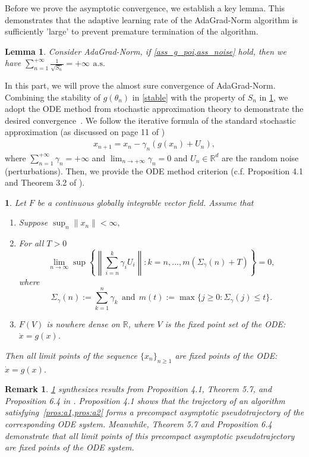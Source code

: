 \documentclass[standalone]{article}
\newcommand{\R}{\mathbb{R}}
\newtheorem{lem}{Lemma}[section]
\newtheorem{rem}{Remark}
\newtheorem{pros}[thm]{\text{Proposition}}
\begin{document}
Before we prove the asymptotic convergence, we establish a key lemma. This demonstrates that the adaptive learning rate of the AdaGrad-Norm algorithm is sufficiently 'large' to prevent premature termination of the algorithm.
\begin{lem}\label{step size}
   Consider AdaGrad-Norm, if \cref{ass_g_poi,ass_noise} hold,  then we have $\sum_{n=1}^{+\infty}\frac{1}{\sqrt{S_{n}}}=+\infty \, \ \text{a.s.}$
\end{lem}


In this part, we will prove the almost sure convergence of AdaGrad-Norm. Combining the stability of $g(\theta_n)$  in \cref{stable} with the property of $S_n$ in \cref{step size}, we adopt the ODE method from stochastic approximation theory to demonstrate the desired convergence~\citep{benaim2006dynamics}. We follow the iterative formula of the standard stochastic approximation (as discussed on page 11 of \cite{benaim2006dynamics})
\begin{align}\label{SA}
x_{n+1} = x_{n} - \gamma_{n}(g(x_{n})+U_{n}),
\end{align}
where $\sum_{n=1}^{+\infty}\gamma_{n}=+\infty$ and $\lim_{n\rightarrow+\infty}\gamma_{n}=0$ and $U_n \in \R^d$ are the random noise (perturbations). Then, we provide the ODE method criterion (c.f. Proposition 4.1 and Theorem 3.2 of \cite{benaim2006dynamics}).
\begin{pros}\label{SA_p}
Let $F$ be a continuous globally integrable vector field. Assume that
\begin{enumerate}[label=\textnormal{(A.\arabic*)},leftmargin=*]
    \item\label{pros:a1} Suppose $\sup_n \|x_n\|< \infty,$ 
    \item\label{pros:a2} For all $T > 0$
    \[
    \lim_{n \to \infty} \sup \left\lbrace \left\lVert \sum_{i=n}^{k} \gamma_{i}U_{i} \right\lVert : k = n, \dots, m(\Sigma_{\gamma}(n) + T) \right\rbrace = 0,
    \]
    where 
    \[\Sigma_\gamma(n):=\sum_{k=1}^{n}\gamma_{k}\ \ \text{and}\ \ m(t):=\max\{j\ge 0:  \Sigma_{\gamma}(j)\le t\}.\] 
    \item\label{pros:a3} \(F(V)\) is nowhere dense on \(\mathbb{R}\), where \(V\) is the fixed point set of the ODE: \(\dot{x} = g(x)\).

\end{enumerate}
Then all limit points of the sequence \(\{x_{n}\}_{n\ge 1}\) are fixed points of the ODE: \(\dot{x} = g(x)\).
\end{pros}
\begin{rem}
\cref{SA_p} synthesizes results from Proposition 4.1, Theorem 5.7, and Proposition 6.4 in \cite{benaim2006dynamics}. Proposition 4.1 shows that the trajectory of an algorithm satisfying~\cref{pros:a1,pros:a2}  forms a precompact asymptotic pseudotrajectory of the corresponding ODE system. Meanwhile, Theorem 5.7 and Proposition 6.4 demonstrate that all limit points of this precompact asymptotic pseudotrajectory are fixed points of the ODE system. 
\end{rem}
\end{document}
